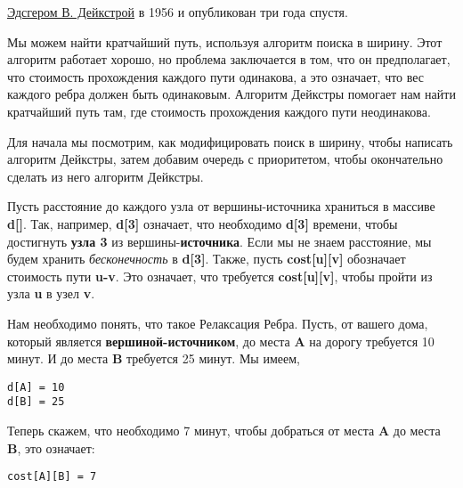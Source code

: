 \href{https://en.wikipedia.org/wiki/Edsger_W._Dijkstra}{\underline{Эдсгером В. Дейкстрой}} в 1956 и опубликован три года спустя.

\vspace{\baselineskip}
Мы можем найти кратчайший путь, используя алгоритм поиска в ширину. Этот алгоритм работает хорошо, но проблема заключается в том, что он предполагает, что стоимость прохождения каждого пути одинакова, а это означает, что вес каждого ребра должен быть одинаковым. Алгоритм Дейкстры помогает нам найти кратчайший путь там, где стоимость прохождения каждого пути неодинакова.

\vspace{\baselineskip}
Для начала мы посмотрим, как модифицировать поиск в ширину, чтобы написать алгоритм Дейкстры, затем добавим очередь с приоритетом, чтобы окончательно сделать из него алгоритм Дейкстры.

\vspace{\baselineskip}
Пусть расстояние до каждого узла от вершины-источника храниться в массиве \textbf{d[]}. Так, например, \textbf{d[3]} означает, что необходимо \textbf{d[3]} времени, чтобы достигнуть \textbf{узла 3} из вершины-\textbf{источника}. Если мы не знаем расстояние, мы будем хранить \textit{бесконечность} в \textbf{d[3]}. Также, пусть \textbf{cost[u][v]} обозначает стоимость пути \textbf{u-v}. Это означает, что требуется \textbf{cost[u][v]}, чтобы пройти из узла \textbf{u} в узел \textbf{v}.

\vspace{\baselineskip}

\vspace{\baselineskip}
Нам необходимо понять, что такое Релаксация Ребра. Пусть, от вашего дома, который является \textbf{вершиной-источником}, до места \textbf{A} на дорогу требуется 10 минут. И до места \textbf{B} требуется 25 минут. Мы имеем,

\vspace{\baselineskip}
\begin{tcolorbox}
\begin{verbatim} 
d[A] = 10
d[B] = 25
\end{verbatim}
\end{tcolorbox}

\vspace{\baselineskip}
Теперь скажем, что необходимо 7 минут, чтобы добраться от места \textbf{A} до места \textbf{B}, это означает:

\vspace{\baselineskip}
\begin{tcolorbox}
\begin{verbatim} 
cost[A][B] = 7
\end{verbatim}
\end{tcolorbox}

